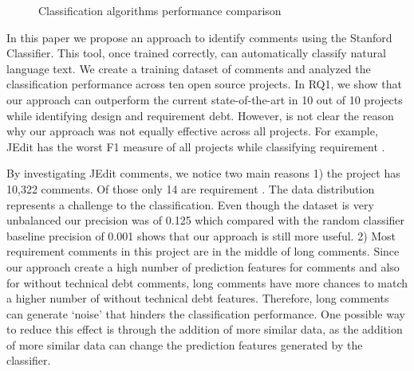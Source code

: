 \begin{figure}[!thb]
  \centering
  \caption{Classification algorithms performance comparison}
  \label{fig:algorithms_comparison}
\end{figure}

In this paper we propose an approach to identify \SATD comments using the Stanford Classifier. This tool, once trained correctly, can automatically classify natural language text. We create a training dataset of \SATD comments and analyzed the classification performance across ten open source projects. In RQ1, we show that our approach can outperform the current state-of-the-art in 10 out of 10 projects while identifying design and requirement debt. However, is not clear the reason why our approach was not equally effective across all projects. For example, JEdit has the worst F1 measure of all projects while classifying requirement \SATD.

By investigating JEdit comments, we notice two main reasons 1) the project has 10,322 comments. Of those only 14 are requirement \SATD. The data distribution represents a challenge to the classification. Even though the dataset is very unbalanced our precision was of 0.125 which compared with the random classifier baseline precision of 0.001 shows that our approach is still more useful. 2) Most requirement \SATD comments in this project are in the middle of long comments. Since our approach create a high number of prediction features for \SATD comments and also for without technical debt comments, long comments have more chances to match a higher number of without technical debt features. Therefore, long comments can generate `noise' that hinders the classification performance. One possible way to reduce this effect is through the addition of more similar data, as the addition of more similar data can change the prediction features generated by the classifier. 

